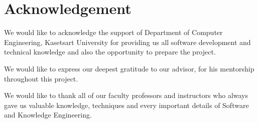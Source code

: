 \chapter*{Acknowledgement}
\label{chap:acknowledgement}

We would like to acknowledge the support of Department of Computer Engineering, Kasetsart University for providing us all
software development and technical knowledge and also the opportunity to prepare the project.

We would like to express our deepest gratitude to our advisor, \usevar{\srsAdvisorName} for his mentorship throughout this project.

We would like to thank all of our faculty professors and instructors who always gave us valuable knowledge, techniques and
every important details of Software and Knowledge Engineering.

\vspace{.2in}
\begin{flushright}
    \usevar{\srsAuthorOne} \\
    \usevar{\srsAuthorTwo}
\end{flushright}